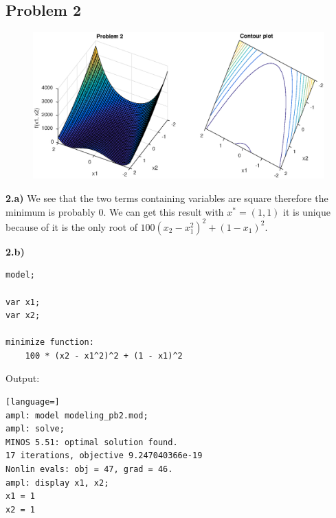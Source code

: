\pagebreak

\subsection{Problem 2}
\begin{figure}[h]
	\includegraphics[width=\textwidth]{fig/model/problem2}
\end{figure}

\textbf{2.a)} We see that the two terms containing variables are square therefore the minimum is probably $0$. We can get this result with $x^* = (1,1)$ it is unique because of it is the only root of $100(x_2 - x_1^2)^2 + (1-x_1)^2$.

\textbf{2.b)} 

\begin{lstlisting}
model;

var x1;
var x2;

minimize function:
	100 * (x2 - x1^2)^2 + (1 - x1)^2
\end{lstlisting}

Output:

\begin{lstlisting}[language=]
ampl: model modeling_pb2.mod;
ampl: solve;
MINOS 5.51: optimal solution found.
17 iterations, objective 9.247040366e-19
Nonlin evals: obj = 47, grad = 46.
ampl: display x1, x2;
x1 = 1
x2 = 1
\end{lstlisting}

